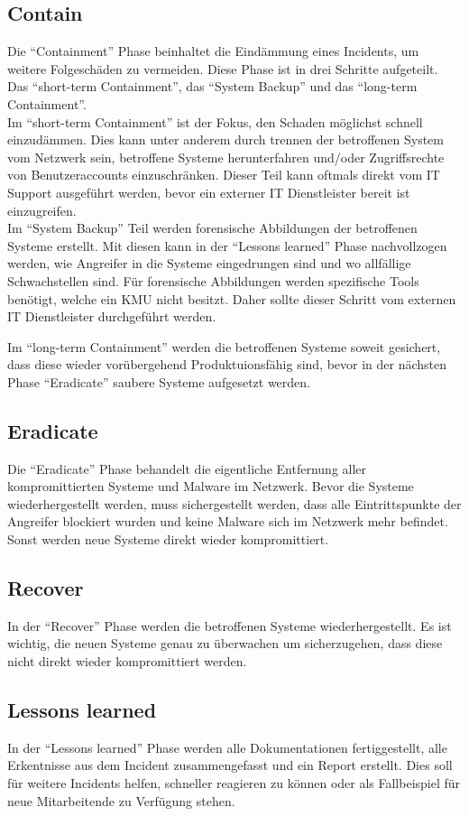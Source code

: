 \subsection{Contain}
Die ``Containment'' Phase beinhaltet die Eindämmung eines Incidents, um weitere Folgeschäden zu vermeiden.
Diese Phase ist in drei Schritte aufgeteilt. 
Das ``short-term Containment'', das ``System Backup'' und das ``long-term Containment''.\\

Im ``short-term Containment'' ist der Fokus, den Schaden möglichst schnell einzudämmen.
Dies kann unter anderem durch trennen der betroffenen System vom Netzwerk sein, betroffene Systeme herunterfahren und/oder Zugriffsrechte von Benutzeraccounts einzuschränken.
Dieser Teil kann oftmals direkt vom IT Support ausgeführt werden, bevor ein externer IT Dienstleister bereit ist einzugreifen.\\

Im ``System Backup'' Teil werden forensische Abbildungen der betroffenen Systeme erstellt.
Mit diesen kann in der ``Lessons learned'' Phase nachvollzogen werden, wie Angreifer in die Systeme eingedrungen sind und wo allfällige Schwachstellen sind. 
Für forensische Abbildungen werden spezifische Tools benötigt, welche ein KMU nicht besitzt. 
Daher sollte dieser Schritt vom externen IT Dienstleister durchgeführt werden.

Im ``long-term Containment'' werden die betroffenen Systeme soweit gesichert, dass diese wieder vorübergehend Produktuionsfähig sind, bevor in der nächsten Phase ``Eradicate'' saubere Systeme aufgesetzt werden.

\subsection{Eradicate}
Die ``Eradicate'' Phase behandelt die eigentliche Entfernung aller kompromittierten Systeme und Malware im Netzwerk.
Bevor die Systeme wiederhergestellt werden, muss sichergestellt werden, dass alle Eintrittspunkte der Angreifer blockiert wurden und keine Malware sich im Netzwerk mehr befindet.
Sonst werden neue Systeme direkt wieder kompromittiert.

\subsection{Recover}
In der ``Recover'' Phase werden die betroffenen Systeme wiederhergestellt.
Es ist wichtig, die neuen Systeme genau zu überwachen um sicherzugehen, dass diese nicht direkt wieder kompromittiert werden. 


\subsection{Lessons learned}
In der ``Lessons learned'' Phase werden alle Dokumentationen fertiggestellt, alle Erkentnisse aus dem Incident zusammengefasst und ein Report erstellt.
Dies soll für weitere Incidents helfen, schneller reagieren zu können oder als Fallbeispiel für neue Mitarbeitende zu Verfügung stehen. 